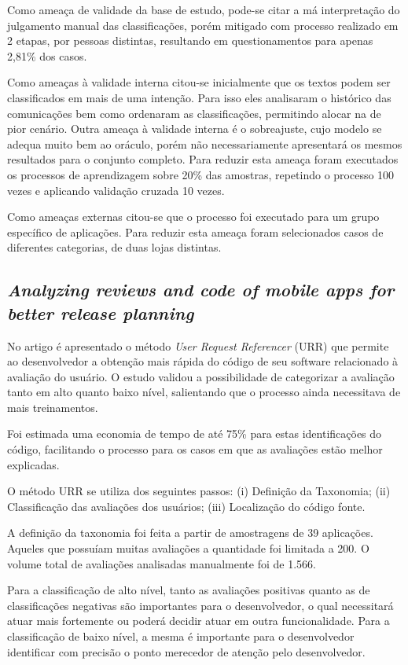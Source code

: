 Como ameaça de validade da base de estudo, pode-se citar a má interpretação do julgamento manual das classificações, porém mitigado com processo realizado em 2 etapas, por pessoas distintas, resultando em questionamentos para apenas 2,81\% dos casos.

Como ameaças à validade interna citou-se inicialmente que os textos podem ser classificados em mais de uma intenção. Para isso eles analisaram o histórico das comunicações bem como ordenaram as classificações, permitindo alocar na de pior cenário. Outra ameaça à validade interna é o sobreajuste, cujo modelo se adequa muito bem ao oráculo, porém não necessariamente apresentará os mesmos resultados para o conjunto completo. Para reduzir esta ameaça foram executados os processos de aprendizagem sobre 20\% das amostras, repetindo o processo 100 vezes e aplicando validação cruzada 10 vezes.

Como ameaças externas citou-se que o processo foi executado para um grupo específico de aplicações. Para reduzir esta ameaça foram selecionados casos de diferentes categorias, de duas lojas distintas.

\subsection{\textit{Analyzing reviews and code of mobile apps for better release planning}}
No artigo \cite{Ciurumelea2017analyzing} é apresentado o método \textit{User Request Referencer} (URR) que permite ao desenvolvedor a obtenção mais rápida do código de seu software relacionado à avaliação do usuário. O estudo validou a possibilidade de categorizar a avaliação tanto em alto quanto baixo nível, salientando que o processo ainda necessitava de mais treinamentos.

Foi estimada uma economia de tempo de até 75\% para estas identificações do código, facilitando o processo para os casos em que as avaliações estão melhor explicadas.

O método URR se utiliza dos seguintes passos: (i) Definição da Taxonomia; (ii) Classificação das avaliações dos usuários; (iii) Localização do código fonte.

A definição da taxonomia foi feita a partir de amostragens de 39 aplicações. Aqueles que possuíam muitas avaliações a quantidade foi limitada a 200. O volume total de avaliações analisadas manualmente foi de 1.566.

Para a classificação de alto nível, tanto as avaliações positivas quanto as de classificações negativas são importantes para o desenvolvedor, o qual necessitará atuar mais fortemente ou poderá decidir atuar em outra funcionalidade.
Para a classificação de baixo nível, a mesma é importante para o desenvolvedor identificar com precisão o ponto merecedor de atenção pelo desenvolvedor.

